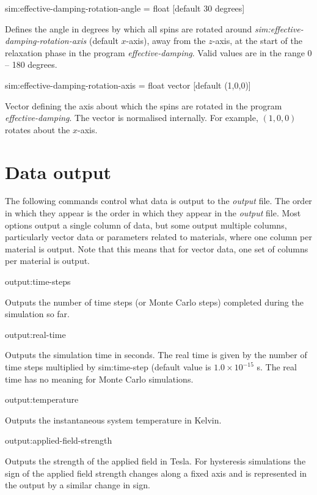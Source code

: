  {\zicf sim:effective-damping-rotation-angle = float [default $30$ degrees]}
 Defines the angle in degrees by which all spins are rotated around
 \textit{sim:effective-damping-rotation-axis} (default $x$-axis), away from the $z$-axis,
 at the start of the relaxation phase in the program
 \textit{effective-damping}. Valid values are in the range 0 -- 180 degrees.

 {\zicf sim:effective-damping-rotation-axis = float vector [default (1,0,0)]}
 Vector defining the axis about which the spins are rotated in the program
 \textit{effective-damping}. The vector is normalised internally. For example,
 $(1,0,0)$ rotates about the $x$-axis.

\section*{Data output}
The following commands control what data is output to the \textit{output} file. The order in which they appear is the order in which they appear in the \textit{output} file. Most options output a single column of data, but some output multiple columns, particularly vector data or parameters related to materials, where one column per material is output. Note that this means that for vector data, one set of columns per material is output.

{\zicf output:time-steps} Outputs the number of time steps (or Monte Carlo steps) completed during the simulation so far.

{\zicf output:real-time} Outputs the simulation time in seconds. The real time is given by the number of time steps multiplied by sim:time-step (default value is $1.0 \times 10^{-15}$ s. The real time has no meaning for Monte Carlo simulations.

{\zicf output:temperature} Outputs the instantaneous system temperature in Kelvin.

{\zicf output:applied-field-strength} Outputs the strength of the applied field in Tesla. For hysteresis simulations the sign of the applied field strength changes along a fixed axis and is represented in the output by a similar change in sign.

